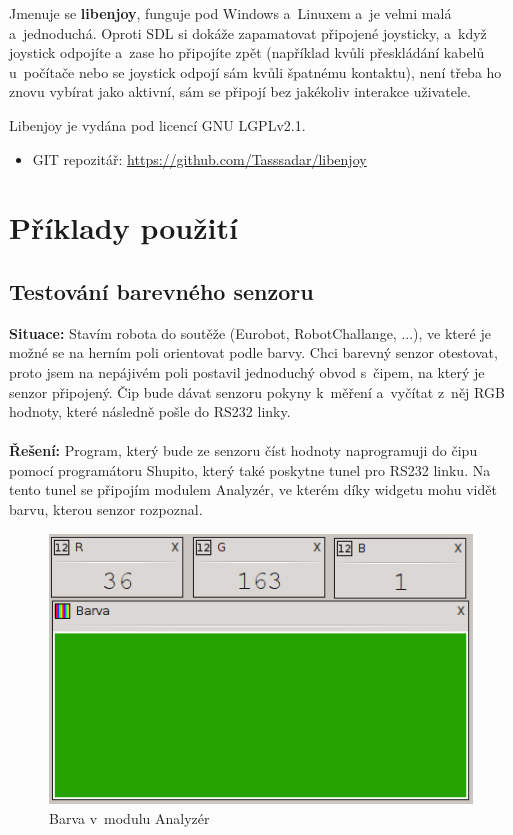 \documentclass[12pt, a4paper, oneside]{article}
\begin{document}
Jmenuje se {\bf libenjoy}, funguje pod Windows a~Linuxem a~je velmi malá a~jednoduchá. Oproti SDL si dokáže zapamatovat připojené joysticky, a~když joystick odpojíte a~zase ho připojíte zpět (například kvůli přeskládání kabelů u~počítače nebo se joystick odpojí sám kvůli špatnému kontaktu), není třeba ho znovu vybírat jako aktivní, sám se připojí bez jakékoliv interakce uživatele.

Libenjoy je vydána pod licencí GNU LGPLv2.1\cite{lgpl}.

\begin{itemize}
\item GIT repozitář: \url{https://github.com/Tasssadar/libenjoy}
\end{itemize}

\newpage
\section{Příklady použití}
\subsection{Testování barevného senzoru}
{\bf Situace:} Stavím robota do soutěže (Eurobot, RobotChallange, ...), ve které je možné se na herním poli orientovat podle barvy. Chci barevný senzor otestovat, proto jsem na nepájivém poli postavil jednoduchý obvod s~čipem, na který je senzor připojený. Čip bude dávat senzoru pokyny k~měření a~vyčítat z~něj RGB hodnoty, které následně pošle do RS232 linky.\\
\\
{\bf Řešení:} Program, který bude ze senzoru číst hodnoty naprogramuji do čipu pomocí programátoru Shupito, který také poskytne tunel pro RS232 linku. Na tento tunel se připojím modulem Analyzér, ve kterém díky widgetu  mohu vidět barvu, kterou senzor rozpoznal.

\begin{figure}[h]
\begin{center}
\includegraphics{img/use_color.png}
\caption{Barva v~modulu Analyzér}
\end{center}
\end{figure}
\end{document}
